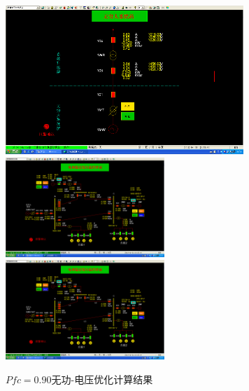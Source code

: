 \documentclass[a4paper]{ctexrep}
\begin{document}
                    \begin{figure}[htbp]
                        \centering
                        \includegraphics[width=9cm]{14.png} 
                        \includegraphics[width=6cm]{15.png} 
                        \includegraphics[width=6cm]{16.png} 
                        \caption{$Pfc=0.90$无功-电压优化计算结果}
                    \end{figure}
\end{document}
